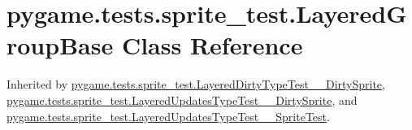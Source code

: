 \hypertarget{classpygame_1_1tests_1_1sprite__test_1_1_layered_group_base}{}\section{pygame.\+tests.\+sprite\+\_\+test.\+Layered\+Group\+Base Class Reference}
\label{classpygame_1_1tests_1_1sprite__test_1_1_layered_group_base}


Inherited by \hyperlink{classpygame_1_1tests_1_1sprite__test_1_1_layered_dirty_type_test_____dirty_sprite}{pygame.\+tests.\+sprite\+\_\+test.\+Layered\+Dirty\+Type\+Test\+\_\+\+\_\+\+Dirty\+Sprite}, \hyperlink{classpygame_1_1tests_1_1sprite__test_1_1_layered_updates_type_test_____dirty_sprite}{pygame.\+tests.\+sprite\+\_\+test.\+Layered\+Updates\+Type\+Test\+\_\+\+\_\+\+Dirty\+Sprite}, and \hyperlink{classpygame_1_1tests_1_1sprite__test_1_1_layered_updates_type_test_____sprite_test}{pygame.\+tests.\+sprite\+\_\+test.\+Layered\+Updates\+Type\+Test\+\_\+\+\_\+\+Sprite\+Test}.

